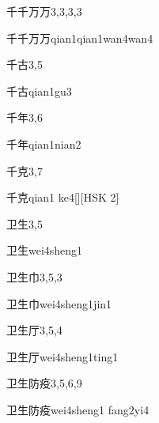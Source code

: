 \begin{entry}{千千万万}{3,3,3,3}
  \begin{phonetics}{千千万万}{qian1qian1wan4wan4}
  \end{phonetics}
\end{entry}

\begin{entry}{千古}{3,5}
  \begin{phonetics}{千古}{qian1gu3}
  \end{phonetics}
\end{entry}

\begin{entry}{千年}{3,6}
  \begin{phonetics}{千年}{qian1nian2}
  \end{phonetics}
\end{entry}

\begin{entry}{千克}{3,7}
  \begin{phonetics}{千克}{qian1 ke4}[][HSK 2]
  \end{phonetics}
\end{entry}

\begin{entry}{卫生}{3,5}
  \begin{phonetics}{卫生}{wei4sheng1}
  \end{phonetics}
\end{entry}

\begin{entry}{卫生巾}{3,5,3}
  \begin{phonetics}{卫生巾}{wei4sheng1jin1}
  \end{phonetics}
\end{entry}

\begin{entry}{卫生厅}{3,5,4}
  \begin{phonetics}{卫生厅}{wei4sheng1ting1}
  \end{phonetics}
\end{entry}

\begin{entry}{卫生防疫}{3,5,6,9}
  \begin{phonetics}{卫生防疫}{wei4sheng1 fang2yi4}
  \end{phonetics}
\end{entry}

